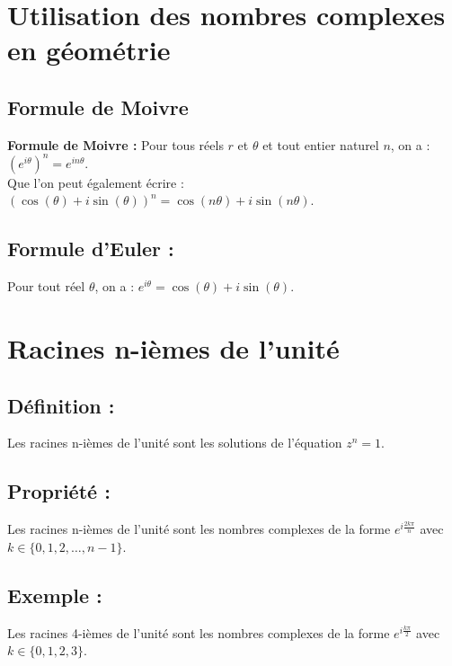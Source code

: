 \documentclass[a4paper,12pt]{article}
\begin{document}
    \begin{center}
    \end{center}

    \section{Utilisation des nombres complexes en géométrie}
    \subsection{Formule de Moivre}
    \textbf{Formule de Moivre :} Pour tous réels $r$ et $\theta$ et tout entier naturel $n$, on a : $(e^{i\theta})^n = e^{in\theta}$. \\ Que l'on peut également écrire : $(\cos(\theta) + i\sin(\theta))^n = \cos(n\theta) + i\sin(n\theta)$.
    \subsection{Formule d'Euler :} Pour tout réel $\theta$, on a : $e^{i\theta} = \cos(\theta) + i\sin(\theta)$.

    \section{Racines n-ièmes de l'unité}
    \subsection{Définition :} Les racines n-ièmes de l'unité sont les solutions de l'équation $z^n = 1$.
    \subsection{Propriété :} Les racines n-ièmes de l'unité sont les nombres complexes de la forme $e^{i\frac{2k\pi}{n}}$ avec $k \in \{0, 1, 2, \ldots, n-1\}$.
    \subsection{Exemple :} Les racines 4-ièmes de l'unité sont les nombres complexes de la forme $e^{i\frac{k\pi}{2}}$ avec $k \in \{0, 1, 2, 3\}$.
\end{document}
